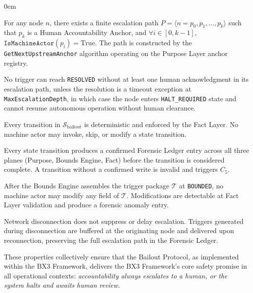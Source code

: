 \begin{trivlist}\itemindent0em
\item[\textbf{Upstream Accountability Guarantee}] For any node $n$, there exists a
  finite escalation path $P = \langle n = p_0, p_1, \ldots, p_k \rangle$ such that
  $p_k$ is a Human Accountability Anchor, and $\forall i \in [0, k-1]$,
  $\texttt{IsMachineActor}(p_i) = \text{True}$. The path is constructed by the
  \texttt{GetNextUpstreamAnchor} algorithm operating on the Purpose Layer anchor
  registry.

\item[\textbf{Non-Orphaning Guarantee}] No trigger can reach \texttt{RESOLVED} without
  at least one human acknowledgment in its escalation path, unless the resolution is a
  timeout exception at \texttt{MaxEscalationDepth}, in which case the node enters
  \texttt{HALT\_REQUIRED} state and cannot resume autonomous operation without human
  clearance.

\item[\textbf{Deterministic State Transitions}] Every transition in
  $\mathcal{S}_{\text{bailout}}$ is deterministic and enforced by the Fact Layer.
  No machine actor may invoke, skip, or modify a state transition.

\item[\textbf{Audit Completeness Guarantee}] Every state transition produces a
  confirmed Forensic Ledger entry across all three planes (Purpose, Bounds Engine,
  Fact) before the transition is considered complete. A transition without a
  confirmed write is invalid and triggers $C_5$.

\item[\textbf{Immutable Trigger Package}] After the Bounds Engine assembles the
  trigger package $\mathcal{T}$ at \texttt{BOUNDED}, no machine actor may modify any
  field of $\mathcal{T}$. Modifications are detectable at Fact Layer validation and
  produce a forensic anomaly entry.

\item[\textbf{Graceful Degradation}] Network disconnection does not suppress or delay
  escalation. Triggers generated during disconnection are buffered at the originating
  node and delivered upon reconnection, preserving the full escalation path in the
  Forensic Ledger.
\end{trivlist}

\bigskip

These properties collectively ensure that the Bailout Protocol, as implemented within
the BX3 Framework, delivers the BX3 Framework's core safety promise in all operational
contexts: \emph{accountability always escalates to a human, or the system halts and
awaits human review.}